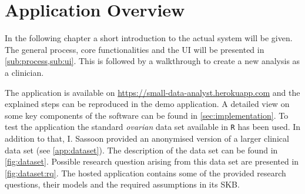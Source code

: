 \section{Application Overview}
\label{sec:app}
In the following chapter a short introduction to the actual system will be given. The general process, core functionalities and the \gls{UI} will be presented in \cref{sub:process,sub:ui}. This is followed by a walkthrough to create a new analysis as a clinician. 

The application is available on \href{https://small-data-analyst.herokuapp.com}{https://small-data-analyst.herokuapp.com} and the explained steps can be reproduced in the demo application. A detailed view on some key components of the software can be found in \autoref{sec:implementation}. To test the application the standard \textit{ovarian} data set available in \texttt{R} has been used. In addition to that, I. Sassoon provided an anonymised version of a larger clinical data set (see \autoref{app:dataset}). The description of the data set can be found in \autoref{fig:dataset}. Possible research question arising from this data set are presented in \autoref{fig:dataset:rq}. The hosted application contains some of the provided research questions, their models and the required assumptions in its \gls{SKB}.









